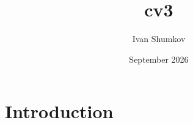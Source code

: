 \documentclass{article}
\title{cv3}
\author{Ivan Shumkov}
\date{September 2026}
\begin{document}
\maketitle

\section{Introduction}
\end{document}
